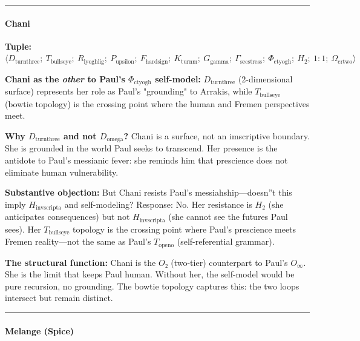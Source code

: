 \documentclass[12pt,a4paper]{article}
\begin{document}
\begin{center}
\rule{0.5\textwidth}{0.4pt}
\end{center}

\paragraph{Chani}

\textbf{Tuple:} $\langle D_{\text{turnthree}};\ T_{\text{bullseye}};\ R_{\text{lyoghlig}};\ P_{\text{upsilon}};\ F_{\text{hardsign}};\ K_{\text{turnm}};\ G_{\text{gamma}};\ \Gamma_{\text{secstress}};\ \Phi_{\text{ctyogh}};\ H_2;\ 1{:}1;\ \Omega_{\text{crtwo}} \rangle$

\textbf{Chani as the \emph{other} to Paul's $\Phi_{\text{ctyogh}}$ self-model:} $D_{\text{turnthree}}$ (2-dimensional surface) represents her role as Paul's "grounding" to Arrakis, while $T_{\text{bullseye}}$ (bowtie topology) is the crossing point where the human and Fremen perspectives meet.

\textbf{Why $D_{\text{turnthree}}$ and not $D_{\text{omega}}$?} Chani is a surface, not an imscriptive boundary. She is grounded in the world Paul seeks to transcend. Her presence is the antidote to Paul's messianic fever: she reminds him that prescience does not eliminate human vulnerability.

\textbf{Substantive objection:} But Chani resists Paul's messiahship---doesn''t this imply $H_{\text{invscripta}}$ and self-modeling? Response: No. Her resistance is $H_2$ (she anticipates consequences) but not $H_{\text{invscripta}}$ (she cannot see the futures Paul sees). Her $T_{\text{bullseye}}$ topology is the crossing point where Paul's prescience meets Fremen reality---not the same as Paul's $T_{\text{openo}}$ (self-referential grammar).

\textbf{The structural function:} Chani is the $O₂$ (two-tier) counterpart to Paul's $O_{\infty}$. She is the limit that keeps Paul human. Without her, the self-model would be pure recursion, no grounding. The bowtie topology captures this: the two loops intersect but remain distinct.

\begin{center}
\rule{0.5\textwidth}{0.4pt}
\end{center}

\paragraph{Melange (Spice)}
\end{document}
